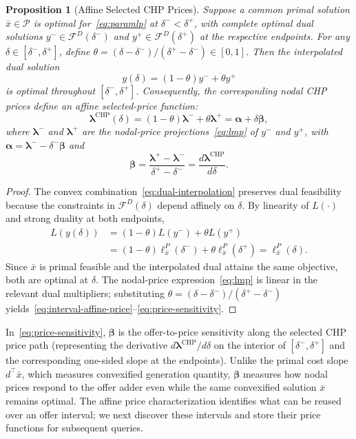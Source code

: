 \documentclass[journal]{IEEEtran}
\newtheorem{proposition}{Proposition}
\newcommand{\blambda}{\bm\lambda}
\newcommand{\CHP}{\mathrm{CHP}}
\begin{document}
\begin{proposition}[Affine Selected CHP Prices]
\label{prop:dual}
Suppose a common primal solution $\bar{x}\in\mathcal{P}$ is optimal for~\eqref{eq:paramlp} at $\delta^-<\delta^+$, with complete optimal dual solutions $y^-\in\mathcal{F}^D(\delta^-)$ and $y^+\in\mathcal{F}^D(\delta^+)$ at the respective endpoints. For any $\delta\in[\delta^-,\delta^+]$, define $\theta=(\delta-\delta^-)/(\delta^+-\delta^-)\in[0,1]$. Then the interpolated dual solution
\begin{equation}
y(\delta) = (1-\theta)y^- + \theta y^+\label{eq:dual-interpolation}
\end{equation}
is optimal throughout $[\delta^-,\delta^+]$. Consequently, the corresponding nodal CHP prices define an affine selected-price function:
\begin{equation}
\blambda^{\CHP}(\delta) = (1-\theta)\blambda^- + \theta\blambda^+ = \bm{\alpha} + \delta\bm{\beta},\label{eq:interval-affine-price}
\end{equation}
where $\blambda^-$ and $\blambda^+$ are the nodal-price projections~\eqref{eq:lmp} of $y^-$ and $y^+$, with $\bm{\alpha}=\blambda^--\delta^-\bm{\beta}$ and
\begin{equation}
\bm{\beta} = \frac{\blambda^+ - \blambda^-}{\delta^+ - \delta^-} = \frac{d\blambda^{\CHP}}{d\delta}.\label{eq:price-sensitivity}
\end{equation}
\end{proposition}

\begin{proof}
The convex combination~\eqref{eq:dual-interpolation} preserves dual feasibility because the constraints in $\mathcal{F}^D(\delta)$ depend affinely on $\delta$. By linearity of $L(\cdot)$ and strong duality at both endpoints,
\begin{align*}
L(y(\delta)) &= (1-\theta)L(y^-) + \theta L(y^+)\\
&= (1-\theta)\ell_{\bar{x}}^P(\delta^-) + \theta\ell_{\bar{x}}^P(\delta^+) = \ell_{\bar{x}}^P(\delta).
\end{align*}
Since $\bar{x}$ is primal feasible and the interpolated dual attains the same objective, both are optimal at $\delta$. The nodal-price expression~\eqref{eq:lmp} is linear in the relevant dual multipliers; substituting $\theta=(\delta-\delta^-)/(\delta^+-\delta^-)$ yields~\eqref{eq:interval-affine-price}--\eqref{eq:price-sensitivity}.
\end{proof}

In~\eqref{eq:price-sensitivity}, $\bm{\beta}$ is the offer-to-price sensitivity along the selected CHP price path (representing the derivative $d\blambda^{\CHP}/d\delta$ on the interior of $[\delta^-,\delta^+]$ and the corresponding one-sided slope at the endpoints). Unlike the primal cost slope $d^\top\bar{x}$, which measures convexified generation quantity, $\bm{\beta}$ measures how nodal prices respond to the offer adder even while the same convexified solution $\bar{x}$ remains optimal. The affine price characterization identifies what can be reused over an offer interval; we next discover these intervals and store their price functions for subsequent queries.
\end{document}
